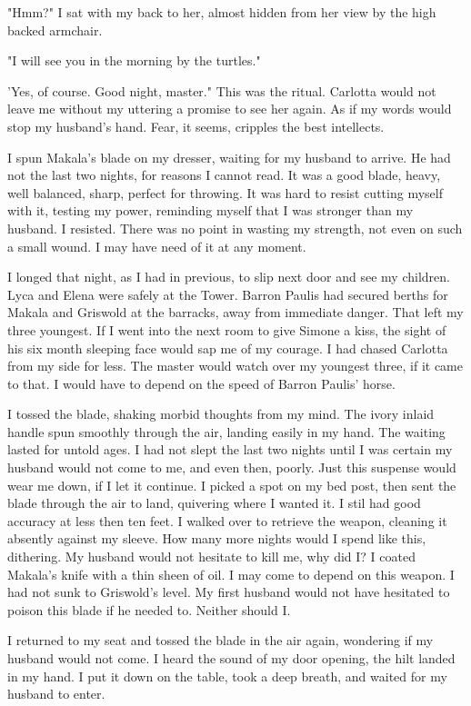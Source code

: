 \documentclass{article}
\begin{document}
"Hmm?" I sat with my back to her, almost hidden from her view by the high backed armchair.

"I will see you in the morning by the turtles."

'Yes, of course. Good night, master." This was the ritual. Carlotta would not leave me without my uttering a promise to see her again. As if my words would stop my husband's hand. Fear, it seems, cripples the best intellects.

I spun Makala's blade on my dresser, waiting for my husband to arrive. He had not the last two nights, for reasons I cannot read. It was a good blade, heavy, well balanced, sharp, perfect for throwing. It was hard to resist cutting myself with it, testing my power, reminding myself that I was stronger than my husband. I resisted. There was no point in wasting my strength, not even on such a small wound. I may have need of it at any moment. 

I longed that night, as I had in previous, to slip next door and see my children. Lyca and Elena were safely at the Tower. Barron Paulis had secured berths for Makala and Griswold at the barracks, away from immediate danger. That left my three youngest. If I went into the next room to give Simone a kiss, the sight of his six month sleeping face would sap me of my courage. I had chased Carlotta from my side for less. The master would watch over my youngest three, if it came to that. I would have to depend on the speed of Barron Paulis' horse. 

I tossed the blade, shaking morbid thoughts from my mind. The ivory inlaid handle spun smoothly through the air, landing easily in my hand. The waiting lasted for untold ages. I had not slept the last two nights until I was certain my husband would not come to me, and even then, poorly. Just this suspense would wear me down, if I let it continue. I picked a spot on my bed post, then sent the blade through the air to land, quivering where I wanted it. I stil had good accuracy at less then ten feet. I walked over to retrieve the weapon, cleaning it absently against my sleeve.  How many more nights would I spend like this, dithering. My husband would not hesitate to kill me, why did I? I coated Makala's knife with a thin sheen of oil. I may come to depend on this weapon. I had not sunk to Griswold's level. My first husband would not have hesitated to poison this blade if he needed to. Neither should I.

I returned to my seat and tossed the blade in the air again, wondering if my husband would not come. I heard the sound of my door opening, the hilt landed in my hand. I put it down on the table, took a deep breath, and waited for my husband to enter.
\end{document}
